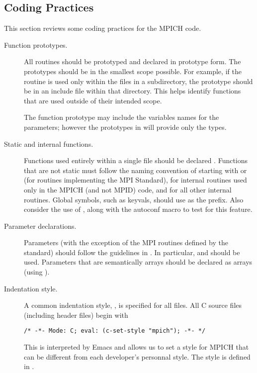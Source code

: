 \documentclass{article}
\begin{document}
\subsection{Coding Practices}
\label{sec:coding-practices}
This section reviews some coding practices for the MPICH code.

\begin{description}
\item[Function prototypes.]
All routines should be prototyped and declared in prototype form.  The
prototypes should be in the 
smallest scope possible.  For example, if the routine is used only
within the files in a subdirectory, the prototype should be in an
include file within that directory.  This helps identify functions that are
used outside of their intended scope.

The function prototype may include the variables names for the parameters;
however the prototypes in  will provide only the types.

\item[Static and internal functions.]
Functions used entirely within a single file should be declared
.  Functions that are not static must follow the naming
convention of starting with  or  (for routines
implementing the MPI Standard),  for internal routines
used only in the MPICH (and not MPID) code, and  for all
other internal routines.  
Global symbols, such as keyvals, should use  as the
prefix.  Also consider the use of , along with the
autoconf macro  to test for this feature.

\item[Parameter declarations.]
Parameters (with the exception of the MPI routines defined by the
standard) should follow the guidelines in 
\cite{coding-standards}.  In 
particular,  and  should be used.
Parameters that are semantically arrays should be declared as arrays
(using \code{[]}).  

\item[Indentation style.]
A common indentation style, , is specified for all files.
All C source files (including header files) begin with 
\begin{verbatim}
/* -*- Mode: C; eval: (c-set-style "mpich"); -*- */
\end{verbatim}
This is interpreted by Emacs and allows us to set a style for MPICH
that can be different from each developer's personnal style.
The style  is defined in .


\end{description}
\end{document}
